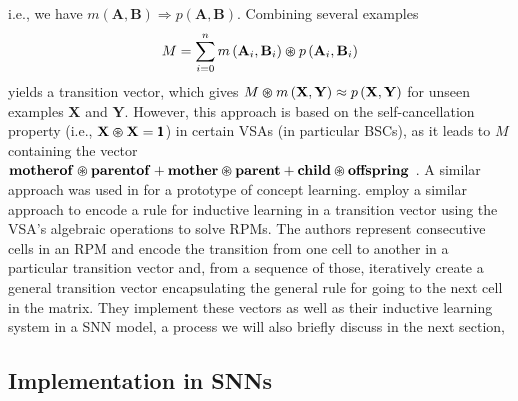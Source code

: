 i.e., we have $m\left(\mathbf{A}, \mathbf{B}\right) \Longrightarrow p\left(\mathbf{A}, \mathbf{B}\right)$.
Combining several examples
\begin{equation*}
	M = \sum_{i=0}^{n} m\left(\mathbf{A}_i, \mathbf{B}_i \right) \varoast p\left(\mathbf{A}_i, \mathbf{B}_i \right)
\end{equation*}
yields a transition vector, which gives $ M \varoast m \left(\mathbf{X}, \mathbf{Y} \right) \approx p \left(\mathbf{X}, \mathbf{Y} \right)$ for unseen examples $\mathbf{X}$ and $\mathbf{Y}$.
However, this approach is based on the self-cancellation property (i.e., $\mathbf{X} \varoast \mathbf{X} = \pmb{1}$) in certain \acp{VSA} (in particular  \acp{BSC}), as it leads to $M$ containing the vector $\mathbf{motherof} \varoast \mathbf{parentof} + \mathbf{mother} \varoast \mathbf{parent} + \mathbf{child} \varoast \mathbf{offspring}$ \parencite[see][for details]{Kanerva2000}.
A similar approach was used in \textcite{Kleyko2015a} for a prototype of concept learning.
\textcite{Rasmussen2011} employ a similar approach to encode a rule for inductive learning in a transition vector using the \ac{VSA}'s algebraic operations to solve \acp{RPM}.
The authors represent consecutive cells in an \ac{RPM} and encode the transition from one cell to another in a particular transition vector and, from a sequence of those, iteratively create a general transition vector encapsulating the general rule for going to the next cell in the matrix.
They implement these vectors as well as their inductive learning system in a \ac{SNN} model, a process we will also briefly discuss in the next section,

\subsection{Implementation in \aclp{SNN}}%
\label{subsec:implementation_in_snns}

